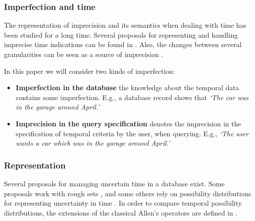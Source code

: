 \subsubsection{Imperfection and time}
The representation of imprecision and its semantics when dealing with time has been studied for a long time. Several proposals for representing and handling imprecise time indications can be found in \cite{DeCaluwe1997,DeTre1997}. Also, the changes between several granularities can be seen as a source of imprecision \cite{Devos1998}.

In this paper we will consider two kinds of imperfection:
\begin{itemize}
\item \textbf{Imperfection in the database} the knowledge about the temporal data contains some imperfection. E.g., a database record shows that \emph{`The car was in the garage around April.'}
 \item \textbf{Imprecision in the query specification} denotes the imprecision in the specification of temporal criteria by the user, when querying. E.g., \emph{`The user wants a car which was in the garage around April.'}
\end{itemize}

\subsubsection{Representation}
Several proposals for managing uncertain time in a database exist. Some proposals work with rough sets \cite{Qiang2009}, and some others rely on possibility distributions for representing uncertainty in time \cite{Dyreson1998,Garrido2009,Galindo2001}. In order to compare temporal possibility distributions, the extensions of the classical Allen's operators \cite{Allen1983} are defined in \cite{Ohlbach2004,Nagypal2003,Dubois2003a,Schockaert2008}.



